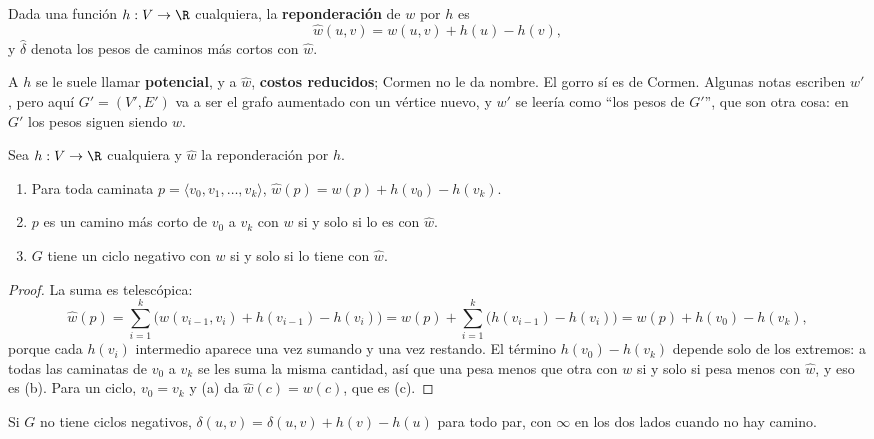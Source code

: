 \documentclass[11pt,letterpaper]{article}
\begin{document}
\begin{definicion}[Reponderación]
  \label{def:reponderacion-johnson}
  Dada una función $h : V \to \R$ cualquiera, la
  \textbf{reponderación} de $w$ por $h$ es
  \[
    \hat{w}(u, v) = w(u, v) + h(u) - h(v) ,
  \]
  y $\hat{\delta}$ denota los pesos de caminos más cortos con
  $\hat{w}$.
\end{definicion}

A $h$ se le suele llamar \textbf{potencial}, y a $\hat{w}$,
\textbf{costos reducidos}; Cormen no le da nombre. El gorro sí es de
Cormen. Algunas notas escriben $w'$, pero aquí $G' = (V', E')$ va a
ser el grafo aumentado con un vértice nuevo, y $w'$ se leería como
``los pesos de $G'$'', que son otra cosa: en $G'$ los pesos siguen
siendo $w$.

\begin{lema}
  \label{lem:reponderacion-johnson}
  Sea $h : V \to \R$ cualquiera y $\hat{w}$ la reponderación por $h$.
  \begin{enumerate}[label=(\alph*), itemsep=0.1em]
    \item Para toda caminata
          $p = \langle v_0, v_1, \dots, v_k \rangle$,
          $\hat{w}(p) = w(p) + h(v_0) - h(v_k)$.
    \item $p$ es un camino más corto de $v_0$ a $v_k$ con $w$ si y
          solo si lo es con $\hat{w}$.
    \item $G$ tiene un ciclo negativo con $w$ si y solo si lo tiene
          con $\hat{w}$.
  \end{enumerate}
\end{lema}

\begin{proof}
  La suma es telescópica:
  \[
    \hat{w}(p)
    = \sum_{i=1}^{k} \bigl( w(v_{i-1}, v_i) + h(v_{i-1}) - h(v_i)
      \bigr)
    = w(p) + \sum_{i=1}^{k} \bigl( h(v_{i-1}) - h(v_i) \bigr)
    = w(p) + h(v_0) - h(v_k) ,
  \]
  porque cada $h(v_i)$ intermedio aparece una vez sumando y una vez
  restando. El término $h(v_0) - h(v_k)$ depende solo de los extremos:
  a todas las caminatas de $v_0$ a $v_k$ se les suma la misma
  cantidad, así que una pesa menos que otra con $w$ si y solo si pesa
  menos con $\hat{w}$, y eso es (b). Para un ciclo, $v_0 = v_k$ y (a)
  da $\hat{w}(c) = w(c)$, que es (c).
\end{proof}

\begin{corolario}
  \label{cor:deshacer-johnson}
  Si $G$ no tiene ciclos negativos,
  $\delta(u, v) = \hat{\delta}(u, v) + h(v) - h(u)$ para todo par, con
  $\infty$ en los dos lados cuando no hay camino.
\end{corolario}
\end{document}
